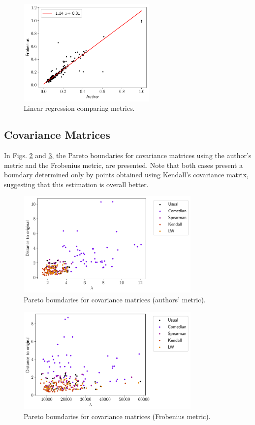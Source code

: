\documentclass[11pt]{article}
\theoremstyle{definition}
\theoremstyle{remark}
\theoremstyle{remark}
\theoremstyle{remark}
\begin{document}
\begin{figure}
  \centering \includegraphics[width=0.6\textwidth]{figs/linear.pdf}
  \caption{Linear regression comparing metrics.}
  \label{fig:linear}
\end{figure}

\subsection{Covariance Matrices}

In Figs. \ref{fig:paretocova} and \ref{fig:paretocovf}, the Pareto boundaries
for covariance matrices using the author's metric and the Frobenius metric, are
presented. Note that both cases present a boundary determined only by points
obtained using Kendall's covariance matrix, suggesting that this estimation is
overall better.

\begin{figure}
  \centering \includegraphics[width=0.8\textwidth]{figs/author-scatter.pdf}
  \caption{Pareto boundaries for covariance matrices (authors' metric).}
  \label{fig:paretocova}
\end{figure}

\begin{figure}
  \centering \includegraphics[width=0.8\textwidth]{figs/fro-scatter.pdf}
  \caption{Pareto boundaries for covariance matrices (Frobenius metric).}
  \label{fig:paretocovf}
\end{figure}
\end{document}
